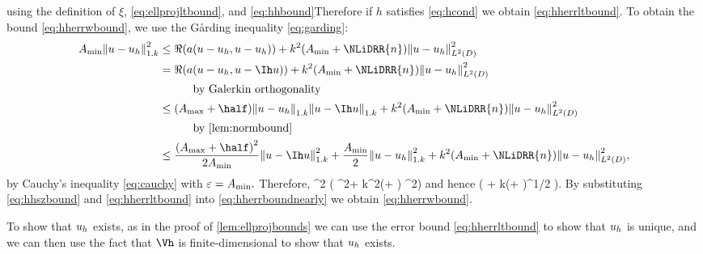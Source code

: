   using the definition of $\xi$, \eqref{eq:ellprojltbound}, and \eqref{eq:hhbound}Therefore if $h$ satisfies \eqref{eq:hcond} we obtain \eqref{eq:hherrltbound}.
To obtain the bound \eqref{eq:hherrwbound}, we use the G\r{a}rding inequality \eqref{eq:garding}:
\begin{align*}
  \Amin \NW{u-\uh}^2 &\leq \Re\mleft(a\mleft(u-\uh,u-\uh\mright)\mright) + k^2\mleft(\Amin+ \NLiDRR{n}\mright) \NLtD{u-\uh}^2\\
                     &= \Re\mleft(a\mleft(u-\uh,u-\Ih u\mright)\mright) + k^2\mleft(\Amin+ \NLiDRR{n}\mright) \NLtD{u-\uh}^2\\
  &\quad\quad\quad\text{by Galerkin orthogonality}\\
                     &\leq \mleft(\Amax+\half\mright) \NW{u-\uh}\NW{u-\Ih u} + k^2\mleft(\Amin+ \NLiDRR{n}\mright) \NLtD{u-\uh}^2\\
  &\quad\quad\quad\text{by \cref{lem:normbound}}\\
  &\leq \frac{\mleft(\Amax+\half\mright)^2}{2\Amin} \NW{u-\Ih u}^2 + \frac{\Amin}2 \NW{u-\uh}^2 + k^2\mleft(\Amin+ \NLiDRR{n}\mright) \NLtD{u-\uh}^2,\\
\end{align*}
by Cauchy's inequality \eqref{eq:cauchy} with $\varepsilon = A_{\min}.$ Therefore,
\beqs
{}^2 \leq {} \mleft( ^2+ k^2\mleft(\Amin+ \mright) ^2\mright)
\eeqs
and hence
\beq\label{eq:hherrboundnearly}
 \lesssim {} \mleft( + k\mleft(\Amin+ \mright)^{1/2} \mright).
\eeq
By substituting \eqref{eq:hhszbound} and \eqref{eq:hherrltbound} into \eqref{eq:hherrboundnearly} we obtain \eqref{eq:hherrwbound}.

To show that $u_{h}$ exists, as in the proof of \cref{lem:ellprojbounds} we can use the error bound \eqref{eq:hherrltbound} to show that $u_{h}$ is unique, and we can then use the fact that $\Vh$ is finite-dimensional to show that $u_{h}$ exists.
\epf



